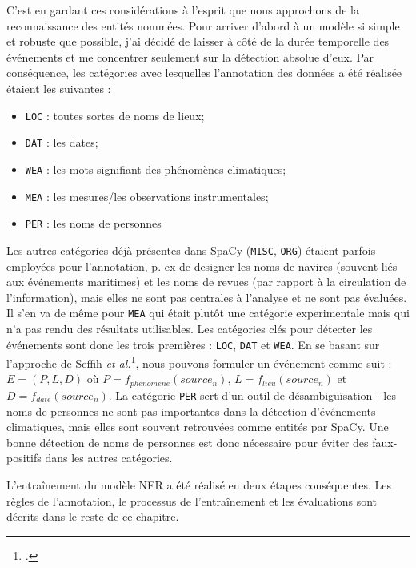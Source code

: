 \documentclass[a4paper,twoside,12pt]{article}
\begin{document}
C'est en gardant ces considérations à l'esprit que nous approchons de la reconnaissance des entités nommées. Pour arriver d'abord à un modèle si simple et robuste que possible, j'ai décidé de laisser à côté de la durée temporelle des événements et me concentrer seulement sur la détection \og absolue \fg{} d'eux. Par conséquence, les catégories avec lesquelles l'annotation des données a été réalisée étaient les suivantes :
\vspace{1ex}
\begin{itemize}[label=$\bullet$]
    \item \texttt{LOC} : toutes sortes de noms de lieux;
    \item \texttt{DAT} : les dates;
    \item \texttt{WEA} : les mots signifiant des phénomènes climatiques;
    \item \texttt{MEA} : les mesures/les observations instrumentales;
    \item \texttt{PER} : les noms de personnes
\end{itemize}
\vspace{2ex}

Les autres catégories déjà présentes dans SpaCy (\texttt{MISC}, \texttt{ORG}) étaient parfois employées pour l'annotation, p. ex de designer les noms de navires (souvent liés aux événements maritimes) et les noms de revues (par rapport à la circulation de l'information), mais elles ne sont pas centrales à l'analyse et ne sont pas évaluées. Il s'en va de même pour \texttt{MEA} qui était plutôt une catégorie experimentale mais qui n'a pas rendu des résultats utilisables. Les catégories clés pour détecter les événements sont donc les trois premières : \texttt{LOC}, \texttt{DAT} et \texttt{WEA}. En se basant sur l'approche de Seffih \textit{et al.}\footcite[175]{sefh_detection_2020}, nous pouvons formuler un événement comme suit : $E = (P,L,D)$ où $P = f_{phenomene}({source}_n)$, $L = f_{lieu}({source}_n)$ et $D = f_{date}({source}_n)$. La catégorie \texttt{PER} sert d'un outil de désambiguïsation - les noms de personnes ne sont pas importantes dans la détection d'événements climatiques, mais elles sont souvent retrouvées comme entités par SpaCy. Une bonne détection de noms de personnes est donc nécessaire pour éviter des faux-positifs dans les autres catégories.

L'entraînement du modèle NER a été réalisé en deux étapes conséquentes. Les règles de l'annotation, le processus de l'entraînement et les évaluations sont décrits dans le reste de ce chapitre.
\end{document}
